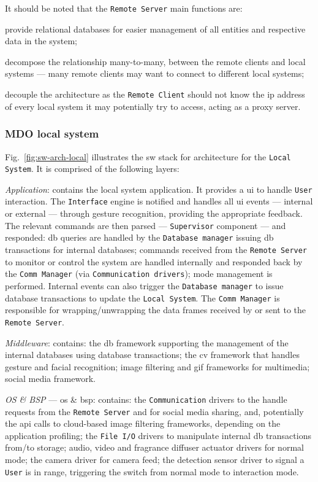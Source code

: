 %
It should be noted that the \texttt{Remote Server} main functions are:
\begin{item-c}
\item provide relational databases for easier management of all entities and
  respective data in the system;
\item decompose the relationship many-to-many, between the remote clients and
  local systems --- many remote clients may want to connect to different local
  systems; 
\item decouple the architecture as the \texttt{Remote Client} should not know
the \gls{ip} address of every local system it may potentially try to access,
acting as a proxy server.
\end{item-c}
%
\subsubsection{MDO local system}
\label{sec:mdo-local-system-1}
%
Fig.~\ref{fig:sw-arch-local} illustrates the \gls{sw} stack for architecture for
the \texttt{Local System}.
It is comprised of the following layers:
\begin{item-c}
\item \emph{Application}: contains the local system application. It provides a
  \gls{ui} to handle \texttt{User} interaction.  The \texttt{Interface} engine
  is notified and handles all \gls{ui} events --- internal or external ---
  through gesture recognition, providing the appropriate feedback. The relevant
  commands are then parsed --- \texttt{Supervisor} component --- and responded: \gls{db}
  queries are handled by the \texttt{Database manager} issuing \gls{db}
  transactions for internal databases;
  commands received from the \texttt{Remote Server} to monitor or control the
  system are handled internally
  and responded back by the \texttt{Comm Manager}  (via \texttt{Communication
    drivers}); mode management is performed.
  Internal events can also trigger the \texttt{Database manager} to issue
  database transactions to update the \texttt{Local System}.
  The \texttt{Comm Manager} is responsible for wrapping\slash unwrapping the data
  frames received by or sent to the \texttt{Remote Server}.
\item \emph{Middleware}: contains: the \gls{db} framework supporting the
  management of the internal databases using database transactions; the \gls{cv}
  framework that handles gesture and facial recognition; image filtering and
  \gls{gif} frameworks for multimedia; social media framework.
\item \emph{OS \& BSP} --- \gls{os} \& \gls{bsp}: contains: the \texttt{Communication}
  drivers to the handle requests from the \texttt{Remote Server} and for social
  media sharing, and, potentially the \gls{api} calls to cloud-based image
  filtering frameworks, depending on the application profiling; the
  \texttt{File I/O} drivers to manipulate internal \gls{db} transactions
  from\slash to storage; audio, video and fragrance diffuser actuator drivers
  for normal mode; the camera driver for camera feed; the detection sensor
  driver to signal a \texttt{User} is in range, triggering the switch from
  normal mode to interaction mode.
\end{item-c}
